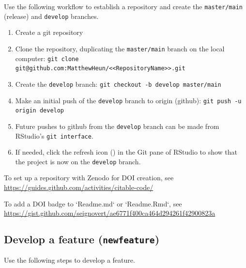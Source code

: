 \documentclass{article}
\begin{document}
Use the following workflow to establish a repository and 
create the \texttt{master/main} (release) and \texttt{develop} branches.
%
\begin{enumerate}

  \item Create a git repository

  \item Clone the repository, duplicating the \texttt{master/main} branch on the local computer:
  		\texttt{git clone git@github.com:MatthewHeun/<<RepositoryName>>.git}
  
  \item Create the \texttt{develop} branch: 
  		\texttt{git checkout -b develop master/main}
		
  \item Make an initial push of the \texttt{develop} branch to origin (github):
        \texttt{git push -u origin develop}
		
  \item Future pushes to github from the \texttt{develop} branch 
  		can be made from RStudio's \texttt{git interface}.

  \item If needed, click the refresh icon 
  		() in the Git pane of RStudio to 
  		show that the project is now on the \texttt{develop} branch.
  
\end{enumerate}

To set up a repository with Zenodo for DOI creation, see 
\url{https://guides.github.com/activities/citable-code/}

To add a DOI badge to `Readme.md` or `Readme.Rmd`, see
\url{https://gist.github.com/seignovert/ae6771f400ca464d294261f42900823a}


\subsection{Develop a feature (\texttt{newfeature})} 
\label{sec:feature}

Use the following steps to develop a feature.
\end{document}
